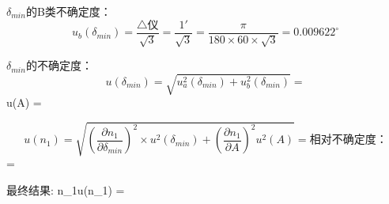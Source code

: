 ${\delta}_{min}$的B类不确定度：
$$u_b({\delta}_{min})=\displaystyle\frac{\bigtriangleup\text{仪}}{\sqrt{3}}
= \frac{1'}{\sqrt{3}} = \frac{\pi}{180\times60\times\sqrt{3}} = 0.009622^{\circ} $$

${\delta}_{min}$的不确定度：
$$u({\delta}_{min}) = \sqrt{u^2_a({\delta}_{min})+u^2_b({\delta}_{min})} = %

$$u(A) = %

$$u(n_1) = \sqrt{(\displaystyle\frac{{\partial}n_1}{{\partial}{\delta}_{min}})^2{\times}u^2({\delta}_{min})+(\displaystyle\frac{{\partial}n_1}{{\partial}A})^2u^2(A)} = %

相对不确定度：
$$\displaystyle{} = %

最终结果:
$${n_1}{\pm}u({n_1}) = %